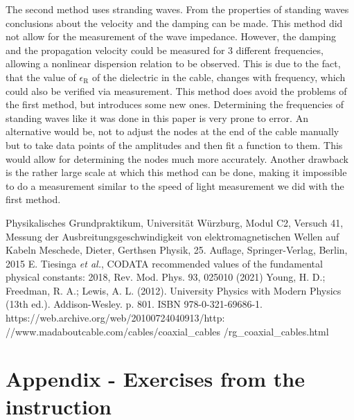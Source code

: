 \documentclass[a4paper,10pt,twocolumn]{article}
\begin{document}
    The second method uses stranding waves.
    From the properties of standing waves conclusions about the velocity and the damping can be made.
    This method did not allow for the measurement of the wave impedance.
    However, the damping and the propagation velocity could be measured for 3 different frequencies, allowing a nonlinear dispersion relation to be observed.
    This is due to the fact, that the value of $\epsilon_{\text{R}}$ of the dielectric in the cable, changes with frequency, which could also be verified via measurement.
    This method does avoid the problems of the first method, but introduces some new ones.
    Determining the frequencies of standing waves like it was done in this paper is very prone to error.
    An alternative would be, not to adjust the nodes at the end of the cable manually but to take data points of the amplitudes and then fit a function to them.
    This would allow for determining the nodes much more accurately.
    Another drawback is the rather large scale at which this method can be done, making it impossible to do a measurement similar to the speed of light measurement we did with the first method.
    \begin{thebibliography}
         Physikalisches Grundpraktikum, Universität Würzburg, Modul C2, Versuch 41, \grqq Messung der Ausbreitungsgeschwindigkeit von elektromagnetischen Wellen auf Kabeln
         Meschede, Dieter, Gerthsen Physik, 25. Auflage, Springer-Verlag, Berlin, 2015
         E. Tiesinga \textit{et al.}, \grqq CODATA recommended values of the fundamental physical constants: 2018\grqq, Rev. Mod. Phys. 93, 025010 (2021)
         Young, H. D.; Freedman, R. A.; Lewis, A. L. (2012). University Physics with Modern Physics (13th ed.). Addison-Wesley. p. 801. ISBN 978-0-321-69686-1.
         https://web.archive.org/web/20100724040913/http: //www.madaboutcable.com/cables/coaxial_cables 
        \newline /rg_coaxial_cables.html 
        \newline
    \end{thebibliography}
    \clearpage
    \section{Appendix - Exercises from the instruction}\label{sec:appendix}
\end{document}
